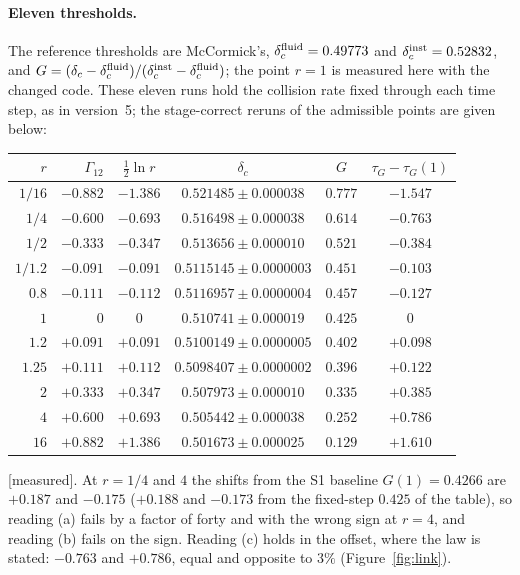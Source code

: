 \documentclass[11pt]{article}
\newcommand{\grade}[1]{\textsf{\small[#1]}}
\begin{document}
\paragraph{Eleven thresholds.} The reference thresholds are McCormick's, $\delta_c^{\rm fluid}=0.49773$ and $\delta_c^{\rm inst}=0.52832$, and $G=(\delta_c-\delta_c^{\rm fluid})/(\delta_c^{\rm inst}-\delta_c^{\rm fluid})$; the point $r=1$ is measured here with the changed code. These eleven runs hold the collision rate fixed through each time step, as in version~5; the stage-correct reruns of the admissible points are given below:
\begin{center}\begin{tabular}{rrcccc}\toprule
$r$ & $\Gamma_{12}$ & $\tfrac12\ln r$ & $\delta_c$ & $G$ & $\tau_G-\tau_G(1)$\\\midrule
$1/16$ & $-0.882$ & $-1.386$ & $0.521485\pm0.000038$ & $0.777$ & $-1.547$\\
$1/4$ & $-0.600$ & $-0.693$ & $0.516498\pm0.000038$ & $0.614$ & $-0.763$\\
$1/2$ & $-0.333$ & $-0.347$ & $0.513656\pm0.000010$ & $0.521$ & $-0.384$\\
$1/1.2$ & $-0.091$ & $-0.091$ & $0.5115145\pm0.0000003$ & $0.451$ & $-0.103$\\
$0.8$ & $-0.111$ & $-0.112$ & $0.5116957\pm0.0000004$ & $0.457$ & $-0.127$\\
$1$ & $0$ & $0$ & $0.510741\pm0.000019$ & $0.425$ & $0$\\
$1.2$ & $+0.091$ & $+0.091$ & $0.5100149\pm0.0000005$ & $0.402$ & $+0.098$\\
$1.25$ & $+0.111$ & $+0.112$ & $0.5098407\pm0.0000002$ & $0.396$ & $+0.122$\\
$2$ & $+0.333$ & $+0.347$ & $0.507973\pm0.000010$ & $0.335$ & $+0.385$\\
$4$ & $+0.600$ & $+0.693$ & $0.505442\pm0.000038$ & $0.252$ & $+0.786$\\
$16$ & $+0.882$ & $+1.386$ & $0.501673\pm0.000025$ & $0.129$ & $+1.610$\\\bottomrule\end{tabular}\end{center}
\grade{measured}. At $r=1/4$ and $4$ the shifts from the S1 baseline $G(1)=0.4266$ are $+0.187$ and $-0.175$ ($+0.188$ and $-0.173$ from the fixed-step $0.425$ of the table), so reading (a) fails by a factor of forty and with the wrong sign at $r=4$, and reading (b) fails on the sign. Reading (c) holds in the offset, where the law is stated: $-0.763$ and $+0.786$, equal and opposite to $3\%$ (Figure~\ref{fig:link}).
\end{document}
